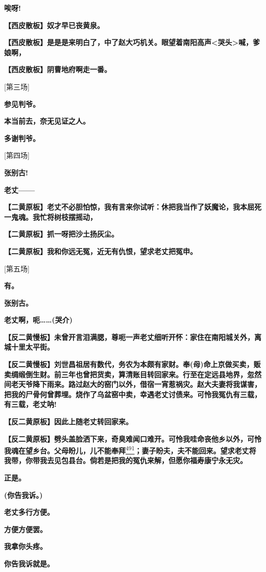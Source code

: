 \textbf{唉呀!}

\textbf{【西皮散板】奴才早已丧黄泉。}

\textbf{【西皮散板】是是是来明白了，中了赵大巧机关。眼望着南阳高声\textless{}哭头\textgreater{}喊，爹娘啊，}

\textbf{【西皮散板】阴曹地府啊走一番。}

{[}第三场{]}

\textbf{参见判爷。}

\textbf{本当前去，奈无见证之人。}

\textbf{多谢判爷。}

{[}第四场{]}

\textbf{张别古!}

\textbf{老丈------}

\textbf{【二黄原板】老丈不必胆怕惊，我有言来你试听：休把我当作了妖魔论，我本屈死一鬼魂。我忙将树枝摆摇动，}

\textbf{【二黄原板】抓一呀把沙土扬灰尘。}

\textbf{【二黄原板】我和你远无冤，近无有仇恨，望求老丈把冤申。}

{[}第五场{]}

\textbf{有。}

\textbf{张别古。}

\textbf{老丈啊，呃\ldots{}\ldots{}(哭介)}

\textbf{【反二黄慢板】未曾开言泪满腮，尊呃一声老丈细听开怀：家住在南阳城关外，离城十里太平街。}

\textbf{【反二黄慢板】刘世昌祖居有数代，务农为本颇有家财。奉(母)命上京做买卖，贩卖绸缎倒生财。前三年也曾把货卖，算清账目转回家来。行至在定远县地界，忽然间老天爷降下雨来。路过赵大的窑门以外，借宿一宵惹祸灾。赵大夫妻将我谋害，把我的尸骨何曾葬埋。烧作了乌盆窑中卖，幸遇老丈讨债来。可怜我冤仇有三载，有三载，老丈呐!}

\textbf{【反二黄原板】因此上随老丈转回家来。}

\textbf{【反二黄原板】劈头盖脸洒下来，奇臭难闻口难开。可怜我哇命丧他乡以外，可怜我魂在望乡台。父母盼儿，儿不能奉拜}\protect\hyperlink{fn491}{\textsuperscript{491}}\textbf{；妻子盼夫，夫不能回来。望求老丈将我带，你带我去见包县台。倘若是把我的冤仇来解，但愿你福寿康宁永无灾。}

\textbf{正是。}

\textbf{(你告我诉。)}

\textbf{老丈多行方便。}

\textbf{方便方便罢。}

\textbf{我拿你头疼。}

\textbf{你告我诉就是。}

